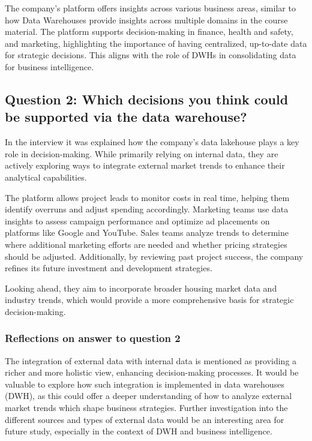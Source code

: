 The company's platform offers insights across various business areas, similar to how Data Warehouses provide insights across multiple domains in the course material. 
The platform supports decision-making in finance, health and safety, and marketing, highlighting the importance of having centralized, up-to-date data for strategic decisions. 
This aligns with the role of DWHs in consolidating data for business intelligence.

\subsection{Question 2: Which decisions you think could be supported via the data warehouse?}

In the interview it was explained how the company's data lakehouse plays a key role in decision-making. While primarily relying on 
internal data, they are actively exploring ways to integrate external market trends to enhance their analytical capabilities.

The platform allows project leads to monitor costs in real time, helping them identify overruns and adjust spending accordingly. 
Marketing teams use data insights to assess campaign performance and optimize ad placements on platforms like Google and YouTube. 
Sales teams analyze trends to determine where additional marketing efforts are needed and whether pricing strategies should be adjusted. 
Additionally, by reviewing past project success, the company refines its future investment and development strategies.

Looking ahead, they aim to incorporate broader housing market data and industry trends, which would provide a more comprehensive basis 
for strategic decision-making.
\subsubsection{Reflections on answer to question 2}

The integration of external data with internal data is mentioned as providing a richer and more holistic view, enhancing decision-making processes. 
It would be valuable to explore how such integration is implemented in data warehouses (DWH), as this could offer a deeper understanding 
of how to analyze external market trends which shape business strategies. Further investigation into the different sources and types of external data 
would be an interesting area for future study, especially in the context of DWH and business intelligence.

